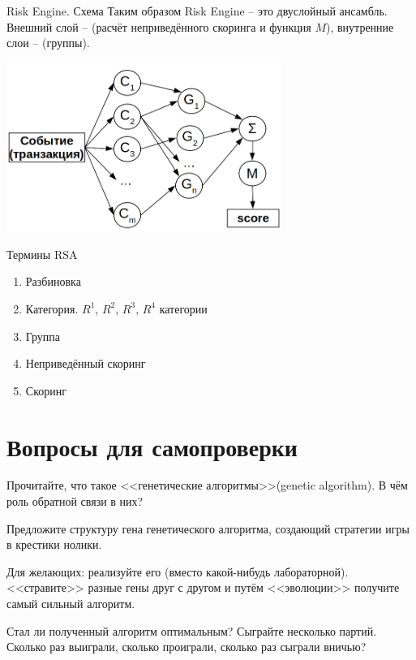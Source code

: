 \begin{frame}{Risk Engine. Схема}\label{frame:risk_score_sxem}
	\small
	Таким образом Risk Engine -- это двуслойный ансамбль. 
	Внешний слой --  (расчёт неприведённого скоринга и функция $M$),
	внутренние слои --  (группы).
	\begin{center}
		\includegraphics[width=9cm]{../pic/rsa_risk_score_sxem.png}
	\end{center}
\end{frame}

\begin{frame}
	\Large
\end{frame}

\begin{frame}{Термины RSA}\label{frame:rsa_risk_engine_terms}
	\begin{enumerate}
		\item Разбиновка 
		\item Категория. $R^1$, $R^2$, $R^3$, $R^4$ категории
		\item Группа
		\item Неприведённый скоринг
		\item Скоринг
	\end{enumerate}
\end{frame}


  
\section{Вопросы для самопроверки}

\begin{frame}
	Прочитайте, что такое <<генетические алгоритмы>>(genetic algorithm).
	В чём роль обратной связи в них?
	
	Предложите структуру гена генетического алгоритма, создающий стратегии игры в крестики нолики. 
	
	Для желающих: реализуйте его (вместо какой-нибудь лабораторной). 
	<<стравите>> разные гены друг с другом и путём <<эволюции>>
	получите самый сильный алгоритм.
	
	Стал ли полученный алгоритм оптимальным? Сыграйте несколько партий. Сколько раз выиграли, 
	сколько проиграли, сколько раз сыграли вничью?
	
\end{frame}

